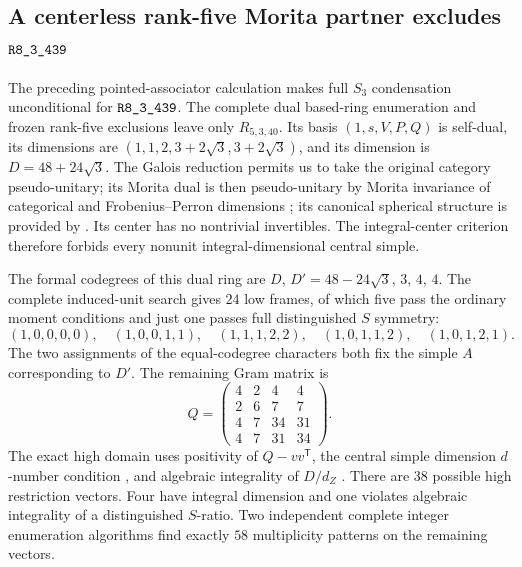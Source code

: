 \subsection{A centerless rank-five Morita partner excludes \texorpdfstring{$\sha{R8_3_439}$}{R8,3,439}}
\label{subsec:r439-centerless-morita}

The preceding pointed-associator calculation makes full $S_3$
condensation unconditional for $\sha{R8_3_439}$.  The complete dual
based-ring enumeration and frozen rank-five exclusions leave only
$R_{5,3,40}$.  Its basis $(1,s,V,P,Q)$ is self-dual, its dimensions are
$(1,1,2,3+2\sqrt3,3+2\sqrt3)$, and its dimension is
$D=48+24\sqrt3$.  The Galois reduction permits us to take the original
category pseudo-unitary; its Morita dual is then pseudo-unitary by
Morita invariance of categorical and Frobenius--Perron dimensions
\cite[Theorem~2.15 and Corollary~8.14]{ENO};
its canonical spherical structure is provided by
\cite[Proposition~8.23]{ENO}.
Its center has no nontrivial invertibles.  The integral-center
criterion therefore forbids every nonunit integral-dimensional
central simple.

The formal codegrees of this dual ring are $D$, $D'=48-24\sqrt3$,
$3$, $4$, $4$.  The complete induced-unit search gives $24$ low
frames, of which five pass the ordinary moment conditions and just
one passes full distinguished $S$ symmetry:
\[
 (1,0,0,0,0),\quad(1,0,0,1,1),\quad(1,1,1,2,2),\quad
 (1,0,1,1,2),\quad(1,0,1,2,1).
\]
The two assignments of the equal-codegree characters both fix the
simple $A$ corresponding to $D'$.  The remaining Gram matrix is
\[
 Q=\begin{pmatrix}4&2&4&4\\2&6&7&7\\4&7&34&31\\4&7&31&34\end{pmatrix}.
\]
The exact high domain uses positivity of $Q-vv^{\mathsf T}$, the
central simple dimension $d$-number condition
\cite[Theorem~1.8]{OstrikCode}, and algebraic integrality of
$D/d_Z$ \cite[Proposition~3.3]{ENO}.
There are $38$ possible high restriction vectors.  Four have integral
dimension and one violates algebraic integrality of a distinguished
$S$-ratio.  Two independent complete integer enumeration algorithms
find exactly $58$ multiplicity patterns on the remaining vectors.

